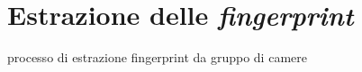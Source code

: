 \section{Estrazione delle \emph{fingerprint}}

processo di estrazione fingerprint da gruppo di camere